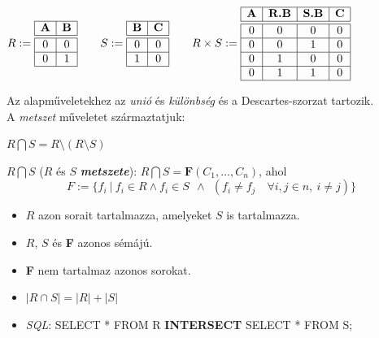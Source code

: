 \documentclass[tikz,12pt,margin=0px]{article}
\begin{document}
    \begin{center}
        $R := \begin{array}{|c|c|}
            \hline
            \text{\textbf{A}} & \text{\textbf{B}} \\ \hline \hline
            0 & 0 \\ \hline
            0 & 1 \\ \hline
        \end{array} \qquad S := \begin{array}{|c|c|}
            \hline
            \text{\textbf{B}} & \text{\textbf{C}} \\ \hline \hline
            0 & 0 \\ \hline
            1 & 0 \\ \hline
        \end{array} \qquad
        R \times S := \begin{array}{|c|c|c|c|}
            \hline
            \text{\textbf{A}} & \text{\textbf{R.B}} & \text{\textbf{S.B}} & \text{\textbf{C}} \\ \hline \hline
            0 & 0 & 0 & 0 \\ \hline
            0 & 0 & 1 & 0 \\ \hline
            0 & 1 & 0 & 0 \\ \hline
            0 & 1 & 1 & 0 \\ \hline
        \end{array}$
    \end{center}

	\noindent Az alapműveletekhez az \emph{unió} és \emph{különbség} és a Descartes-szorzat tartozik.\\
    \noindent A \emph{metszet} műveletet származtatjuk:
    \begin{center}
        $R \bigcap S = R \setminus (R \setminus S)$
    \end{center}

    \noindent $R \bigcap S$ ($R$ és $S$ \emph{\textbf{metszete}}): $R \bigcap S = \textbf{F}(C_1, \ldots, C_n)$, ahol
    \[
        F := \Big\{f_i\ \Big|\ f_i \in R \wedge f_i \in S\ \ \wedge\ \ (f_i \neq f_j \quad  \forall i, j \in n,\ i \neq j)\Big\}
    \]
    \begin{itemize}
        \item $R$ azon sorait tartalmazza, amelyeket $S$ is tartalmazza.
        \item $R$, $S$ és \textbf{F} azonos sémájú.
        \item \textbf{F} nem tartalmaz azonos sorokat.
        \item $\big|R \cap S\big| = \big|R\big| + \big|S\big|$
        \item \emph{SQL}: SELECT * FROM R \textbf{INTERSECT} SELECT * FROM S;
    \end{itemize}
\end{document}
